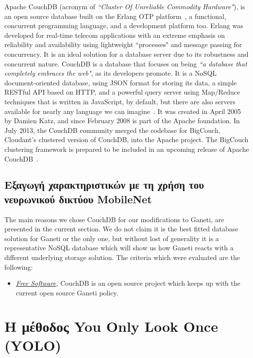 Apache CouchDB (acronym of \emph{``Cluster Of Unreliable Commodity Hardware"}),
is an open source database built on the Erlang OTP platform~, a functional, concurrent programming language, and a development
platform too. Erlang was developed for real-time telecom applications with an
extreme emphasis on reliability and availability using lightweight ``processes"
and message passing for concurrency. It is an
ideal solution for a database server due to its robustness and concurrent
nature. CouchDB is a database that focuses on being \emph{``a database that
completely embraces the web"}, as its developers promote. It is a NoSQL
document-oriented database, using JSON format for storing its data, a simple
RESTful API based on HTTP, and a powerful query server using Map/Reduce
techniques that is written in JavaScript, by default, but there are also servers
available for nearly any language we can
imagine~.
It was created in April 2005 by Damien Katz, and since February 2008 is part of
the Apache foundation. In July 2013, the CouchDB community merged the codebase
for BigCouch, Cloudant's clustered version of CouchDB, into the Apache project.
The BigCouch clustering framework is prepared to be included in an upcoming
release of Apache CouchDB~\cite{bigcouch}.

\subsection{Εξαγωγή χαρακτηριστικών με τη χρήση του νευρωνικού δικτύου MobileNet}\label{sec:mobilenet}
The main reasons we chose CouchDB for our modifications to Ganeti,
are presented in the current section.  We do not claim it is the best fitted
database solution for Ganeti or the only one, but without lost of generality it
is a representative NoSQL database which will show us how Ganeti reacts with a
different underlying storage solution. The criteria which were evaluated are the
following:

\begin{itemize}
  \item \underline{\emph{Free Software,}} CouchDB is an open source project
    which keeps up with the current open source Ganeti policy.
\end{itemize}

\section{Η μέθοδος You Only Look Once (YOLO)}\label{sec:yolo}

